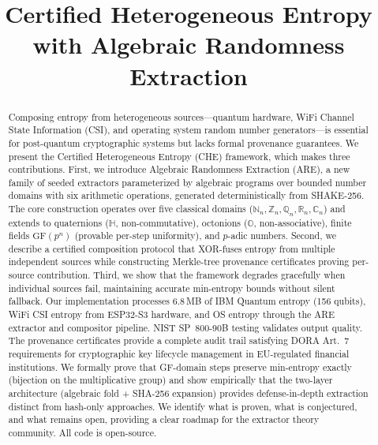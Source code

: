 \documentclass[sigconf,anonymous,review]{acmart}
\title{Certified Heterogeneous Entropy with Algebraic Randomness Extraction}
\theoremstyle{acmdefinition}%
\theoremstyle{acmplain}%
\newcommand{\are}{\textsc{ARE}\xspace}
\newcommand{\che}{\textsc{CHE}\xspace}
\newcommand{\N}{\mathbb{N}}
\newcommand{\Z}{\mathbb{Z}}
\newcommand{\Q}{\mathbb{Q}}
\newcommand{\R}{\mathbb{R}}
\newcommand{\CC}{\mathbb{C}}
\begin{document}
\begin{abstract}
Composing entropy from heterogeneous sources---quantum hardware,
WiFi Channel State Information (CSI), and operating system random
number generators---is essential for post-quantum cryptographic
systems but lacks formal provenance guarantees.
%
We present the Certified Heterogeneous Entropy (\che) framework,
which makes three contributions.
%
First, we introduce Algebraic Randomness Extraction (\are), a new
family of seeded extractors parameterized by algebraic programs over
bounded number domains with six arithmetic operations, generated
deterministically from SHAKE-256.
%
The core construction operates over five classical domains
($\N_n, \Z_n, \Q_n, \R_n, \CC_n$) and extends to quaternions
($\mathbb{H}$, non-commutative), octonions ($\mathbb{O}$,
non-associative), finite fields $\mathrm{GF}(p^n)$ (provable
per-step uniformity), and $p$-adic numbers.
%
Second, we describe a certified composition protocol that XOR-fuses
entropy from multiple independent sources while constructing
Merkle-tree provenance certificates proving per-source contribution.
%
Third, we show that the framework degrades gracefully when individual
sources fail, maintaining accurate min-entropy bounds without silent
fallback.
%
Our implementation processes 6.8\,MB of IBM Quantum entropy (156
qubits), WiFi CSI entropy from ESP32-S3 hardware, and OS entropy
through the \are extractor and compositor pipeline.
%
NIST SP~800-90B testing validates output quality.
%
The provenance certificates provide a complete audit trail satisfying
DORA Art.~7 requirements for cryptographic key lifecycle management
in EU-regulated financial institutions.
%
We formally prove that GF-domain steps preserve min-entropy
exactly (bijection on the multiplicative group) and show
empirically that the two-layer architecture (algebraic fold +
SHA-256 expansion) provides defense-in-depth extraction
distinct from hash-only approaches.
%
We identify what is proven, what is conjectured, and what
remains open, providing a clear roadmap for the extractor
theory community.
%
All code is open-source.
\end{abstract}

\maketitle

\end{document}
